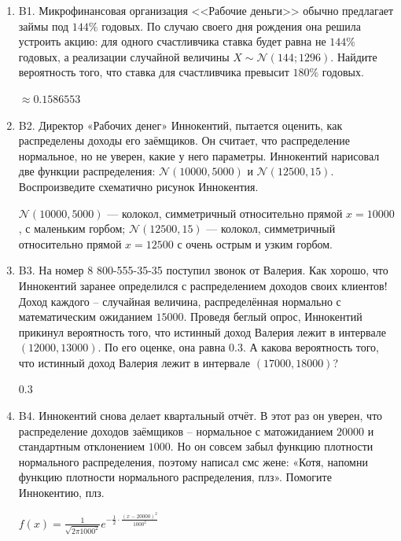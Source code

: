 \documentclass[12pt]{article}
\def \cN{\mathcal{N}}
\newenvironment{problem}{}{}
\newenvironment{sol}{}{} %
\begin{document}
\begin{enumerate}
\begin{problem}
\item[B1.] Микрофинансовая организация <<Рабочие деньги>> обычно предлагает займы под \(144\%\) годовых. По случаю своего дня рождения она решила устроить акцию: для одного счастливчика ставка будет равна не \(144\%\) годовых, а реализации случайной величины \(X\sim \mathcal{N}(144; 1296)\). Найдите вероятность того, что ставка для счастливчика превысит \(180\%\) годовых.

\begin{sol}
$\approx 0.1586553$
\end{sol}
\end{problem}

\begin{problem}
\item[B2.] Директор «Рабочих денег» Иннокентий, пытается оценить, как распределены доходы его заёмщиков. Он считает, что распределение нормальное, но не уверен, какие у него параметры. Иннокентий нарисовал две функции распределения: $\cN(10000, 5000)$ и $\cN(12500, 15)$. Воспроизведите схематично рисунок Иннокентия.

\begin{sol}
$\cN(10000, 5000)$ — колокол, симметричный относительно прямой $x=10000$, с маленьким горбом; $\cN(12500, 15)$ — колокол, симметричный относительно прямой $x=12500$ с очень острым и узким горбом.
\end{sol}
\end{problem}

\begin{problem}
\item[B3.] На номер 8 800-555-35-35 поступил звонок от Валерия. Как хорошо, что Иннокентий заранее определился с распределением доходов своих клиентов! Доход каждого – случайная величина, распределённая нормально с математическим ожиданием $15000$. Проведя беглый опрос, Иннокентий прикинул вероятность того, что истинный доход Валерия лежит в интервале $(12000, 13000)$. По его оценке, она равна $0.3$. А какова вероятность того, что истинный доход Валерия лежит в интервале $(17000, 18000)$?

\begin{sol}
$0.3$
\end{sol}
\end{problem}

\begin{problem}
\item[B4.] Иннокентий снова делает квартальный отчёт. В этот раз он уверен, что распределение доходов заёмщиков – нормальное с матожиданием $20000$ и стандартным отклонением $1000$. Но он совсем забыл функцию плотности нормального распределения, поэтому написал смс жене: «Котя, напомни функцию плотности нормального распределения, плз». Помогите Иннокентию, плз.

\begin{sol}
$f(x) = \frac{1}{\sqrt{2 \pi 1000^2}}e^{-\frac{1}{2}\cdot \frac{(x-20000)^2}{1000^2}}$
\end{sol}
\end{problem}

\end{enumerate}
\end{document}
